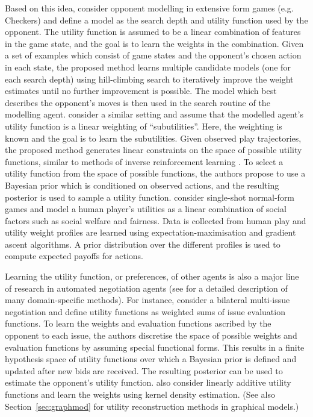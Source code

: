\documentclass[final,1p,times,authoryear]{elsarticle}
\begin{document}
Based on this idea, \citet{cm1996search93,cm1993search} consider opponent modelling in extensive form games (e.g. Checkers) and define a model as the search depth and utility function used by the opponent. The utility function is assumed to be a linear combination of features in the game state, and the goal is to learn the weights in the combination. Given a set of examples which consist of game states and the opponent's chosen action in each state, the proposed method learns multiple candidate models (one for each search depth) using hill-climbing search to iteratively improve the weight estimates until no further improvement is possible. The model which best describes the opponent's moves is then used in the search routine of the modelling agent. \citet{cko2001} consider a similar setting and assume that the modelled agent's utility function is a linear weighting of ``subutilities''. Here, the weighting is known and the goal is to learn the subutilities. Given observed play trajectories, the proposed method generates linear constraints on the space of possible utility functions, similar to methods of inverse reinforcement learning \citep{nr2000}. To select a utility function from the space of possible functions, the authors propose to use a Bayesian prior which is conditioned on observed actions, and the resulting posterior is used to sample a utility function. \citet{gpmg2004} consider single-shot normal-form games and model a human player's utilities as a linear combination of social factors such as social welfare and fairness. Data is collected from human play and utility weight profiles are learned using expectation-maximisation and gradient ascent algorithms. A prior distribution over the different profiles is used to compute expected payoffs for actions.

Learning the utility function, or preferences, of other agents is also a major line of research in automated negotiation agents (see \citet{bhhj2016} for a detailed description of many domain-specific methods). For instance, \citet{ht2008} consider a bilateral multi-issue negotiation and define utility functions as weighted sums of issue evaluation functions. To learn the weights and evaluation functions ascribed by the opponent to each issue, the authors discretise the space of possible weights and evaluation functions by assuming special functional forms. This results in a finite hypothesis space of utility functions over which a Bayesian prior is defined and updated after new bids are received. The resulting posterior can be used to estimate the opponent's utility function. \citet{cj2004} also consider linearly additive utility functions and learn the weights using kernel density estimation. (See also Section~\ref{sec:graphmod} for utility reconstruction methods in graphical models.)
\end{document}
